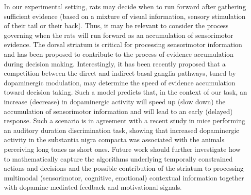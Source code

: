 \par
In our experimental setting, rats may decide when to run forward after gathering sufficient evidence (based on a mixture of visual information, sensory stimulation of their tail or their back).
Thus, it may be relevant to consider the process governing when the rats will run forward as an accumulation of sensorimotor evidence.
The dorsal striatum is critical for processing sensorimotor information\cite{Robbe2018CON} and has been proposed to contribute to the process of evidence accumulation during decision making\cite{Yartsev2018eLife}.
Interestingly, it has been recently proposed that a competition between the direct and indirect basal ganglia pathways, tuned by dopaminergic modulation, may determine the speed of evidence accumulation toward decision taking\cite{Dunovan2016FrontNeuro,Dunovan2019JNeurosci}.
Such a model predicts that, in the context of our task, an increase (decrease) in dopaminergic activity will speed up (slow down) the accumulation of sensorimotor information and will lead to an early (delayed) response.
Such a scenario is in agreement with a recent study in mice performing an auditory duration discrimination task, showing that increased dopaminergic activity in the substantia nigra compacta was associated with the animals perceiving long tones as short ones\cite{Soares2016Science}.
Future work should further investigate how to mathematically capture the algorithms underlying temporally constrained actions and decisions and the possible contribution of the striatum to processing multimodal (sensorimotor, cognitive, emotional) contextual information together with dopamine-mediated feedback and motivational signals.